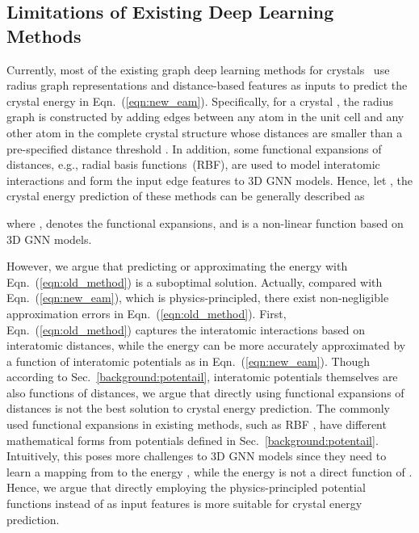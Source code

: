 \documentclass[nohyperref]{article}
\theoremstyle{plain}
\theoremstyle{definition}
\theoremstyle{remark}
\begin{document}
\subsection{Limitations of Existing Deep Learning Methods}
\label{sec:limitation}

Currently, most of the existing graph deep learning methods for crystals~\citep{xie2018crystal, MegNet, GATGNN, ALIGNN} use radius graph representations and distance-based features as inputs to predict the crystal energy in Eqn.~(\ref{eqn:new_eam}). Specifically, for a crystal , the radius graph is constructed by adding edges between any atom  in the unit cell  and any other atom  in the complete crystal structure  whose distances are smaller than a pre-specified distance threshold . In addition, some functional expansions of distances, e.g., radial basis functions~(RBF), are used to model interatomic interactions and form the input edge features to 3D GNN models. Hence, let , the crystal energy prediction  of these methods can be generally described as

where ,  denotes the functional expansions, and  is a non-linear function based on 3D GNN models.

However, we argue that predicting or approximating the energy with Eqn.~(\ref{eqn:old_method}) is a suboptimal solution. Actually, compared with Eqn.~(\ref{eqn:new_eam}), which is physics-principled, there exist non-negligible approximation errors in Eqn.~(\ref{eqn:old_method}). First, Eqn.~(\ref{eqn:old_method}) captures the interatomic interactions based on interatomic distances, while the energy can be more accurately approximated by a function of interatomic potentials as in Eqn.~(\ref{eqn:new_eam}). Though according to Sec.~\ref{background:potentail}, interatomic potentials themselves are also functions of distances, we argue that directly using functional expansions of distances is not the best solution to crystal energy prediction. The commonly used functional expansions in existing methods, such as RBF , have different mathematical forms from potentials defined in Sec.~\ref{background:potentail}. Intuitively, this poses more challenges to 3D GNN models since they need to learn a mapping from  to the energy , while the energy  is not a direct function of . Hence, we argue that directly employing the physics-principled potential functions instead of  as input features is more suitable for crystal energy prediction. 
\end{document}

